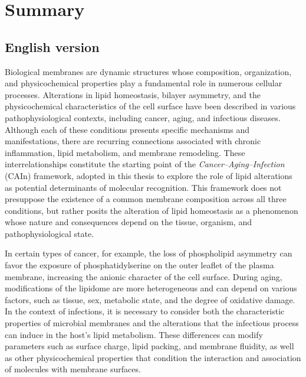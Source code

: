 \newpage
\section*{Summary} %
{}
{} %

\vspace{0.3cm} %

\subsection*{English version}
{}
Biological membranes are dynamic structures whose composition, organization, and physicochemical properties play a fundamental role in numerous cellular processes. Alterations in lipid homeostasis, bilayer asymmetry, and the physicochemical characteristics of the cell surface have been described in various pathophysiological contexts, including cancer, aging, and infectious diseases. Although each of these conditions presents specific mechanisms and manifestations, there are recurring connections associated with chronic inflammation, lipid metabolism, and membrane remodeling. These interrelationships constitute the starting point of the \textit{Cancer--Aging--Infection} (CAIn) framework, adopted in this thesis to explore the role of lipid alterations as potential determinants of molecular recognition. This framework does not presuppose the existence of a common membrane composition across all three conditions, but rather posits the alteration of lipid homeostasis as a phenomenon whose nature and consequences depend on the tissue, organism, and pathophysiological state.

In certain types of cancer, for example, the loss of phospholipid asymmetry can favor the exposure of phosphatidylserine on the outer leaflet of the plasma membrane, increasing the anionic character of the cell surface. During aging, modifications of the lipidome are more heterogeneous and can depend on various factors, such as tissue, sex, metabolic state, and the degree of oxidative damage. In the context of infections, it is necessary to consider both the characteristic properties of microbial membranes and the alterations that the infectious process can induce in the host's lipid metabolism. These differences can modify parameters such as surface charge, lipid packing, and membrane fluidity, as well as other physicochemical properties that condition the interaction and association of molecules with membrane surfaces.


